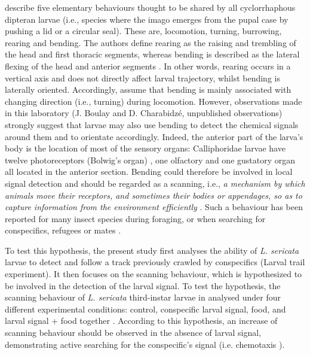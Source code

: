\citet{green_organization_1983} describe five elementary behaviours thought to be shared by all cyclorrhaphous dipteran larvae (i.e., species where the imago emerges from the pupal case by pushing a lid or a circular seal). These are, locomotion, turning, burrowing, rearing and bending. The authors define rearing as the raising and trembling of the head and first thoracic segments, whereas bending is described as the lateral flexing of the head and anterior segments \cite{green_organization_1983}. In other words, rearing occurs in a vertical axis and does not directly affect larval trajectory, whilst bending is laterally oriented. Accordingly, \citet{green_organization_1983} assume that bending is mainly associated with changing direction (i.e., turning) during locomotion. However, observations made in this laboratory (J. Boulay and D. Charabidzé, unpublished observations) strongly suggest that larvae may also use bending to detect the chemical signals around them and to orientate accordingly. Indeed, the anterior part of the larva’s body is the location of most of the sensory organs: Calliphoridae larvae have twelve photoreceptors (Bolwig’s organ) \cite{hinnemann_see_2010}, one olfactory and one gustatory organ \citep{chu-wang_fine_1971, cobb_what_1999,chu-wang_fine_1971-1} all located in the anterior section. Bending could therefore be involved in local signal detection and should be regarded as a scanning, i.e., \textit{a mechanism by which animals move their receptors, and sometimes their bodies or appendages, so as to capture information from the environment efficiently} \cite{bell_searching_1990}. Such a behaviour has been reported for many insect species during foraging, or when searching for conspecifics, refugees or mates \cite{bell_searching_1990}. 

To test this hypothesis, the present study first analyses the ability of \textit{L. sericata} larvae to detect and follow a track previously crawled by conspecifics (Larval trail experiment). It then focuses on the scanning behaviour, which is hypothesized to be involved in the detection of the larval signal. To test the hypothesis, the scanning behaviour of \textit{L. sericata} third-instar larvae in analysed under four different experimental conditions: control, conspecific larval signal, food, and larval signal + food together \cite{boulay_evidence_2013}. According to this hypothesis, an increase of scanning behaviour should be observed in the absence of larval signal, demonstrating active searching for the conspecific’s signal (i.e. chemotaxis \cite{gomez-marin_active_2011}). 

